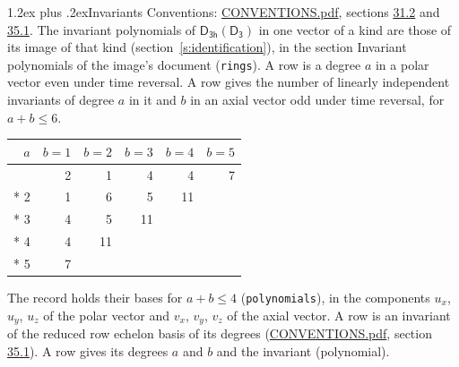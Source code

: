 \documentclass[10pt,a4paper]{article}
\makeatletter
\renewcommand\section{\@startsection{section}{1}{\z@}{-3ex plus -1ex minus -.2ex}%
  {1.2ex plus .2ex}{\normalfont\large\sffamily\bfseries\color{parttitle}}}
\numberwithin{equation}{section}
\newcommand{\grp}[1]{\mathsf{#1}}
\makeatother
\begin{document}
\section{Invariants}\label{s:invariants}
Conventions: \href{../../CONVENTIONS.pdf}{CONVENTIONS.pdf}, sections \href{../../CONVENTIONS.pdf\#conv.31.2}{31.2} and \href{../../CONVENTIONS.pdf\#conv.35.1}{35.1}.
The invariant polynomials of $\grp{D_{3h}}(\grp{D_{3}})$ in one vector of a kind are those of its image of that kind (section~\ref{s:identification}), in the section Invariant polynomials of the image's document (\texttt{rings}).
\leavevmode\label{n:index.degree.polar}\label{n:index.degree.axial}A row is a degree $a$ in a polar vector even under time reversal. A row gives the number of linearly independent invariants of degree $a$ in it and $b$ in an axial vector odd under time reversal, for $a + b \le 6$.
{\small\begin{longtable}{@{}rrrrrr@{}}\toprule
$a$ & $b = 1$ & $b = 2$ & $b = 3$ & $b = 4$ & $b = 5$\\\midrule\endhead
\bottomrule\endfoot\endlastfoot
1 & 2 & 1 & 4 & 4 & 7\\*
2 & 1 & 6 & 5 & 11 & \\*
3 & 4 & 5 & 11 &  & \\*
4 & 4 & 11 &  &  & \\*
5 & 7 &  &  &  & \\
\bottomrule\end{longtable}}
\leavevmode\label{n:local.component.polar}\label{n:local.component.axial}The record holds their bases for $a + b \le 4$ (\texttt{polynomials}), in the components $u_{x}$, $u_{y}$, $u_{z}$ of the polar vector and $v_{x}$, $v_{y}$, $v_{z}$ of the axial vector. \label{n:head.polynomial}A row is an invariant of the reduced row echelon basis of its degrees (\href{../../CONVENTIONS.pdf}{CONVENTIONS.pdf}, section \href{../../CONVENTIONS.pdf\#conv.35.1}{35.1}). A row gives its degrees $a$ and $b$ and the invariant (polynomial).
\end{document}
